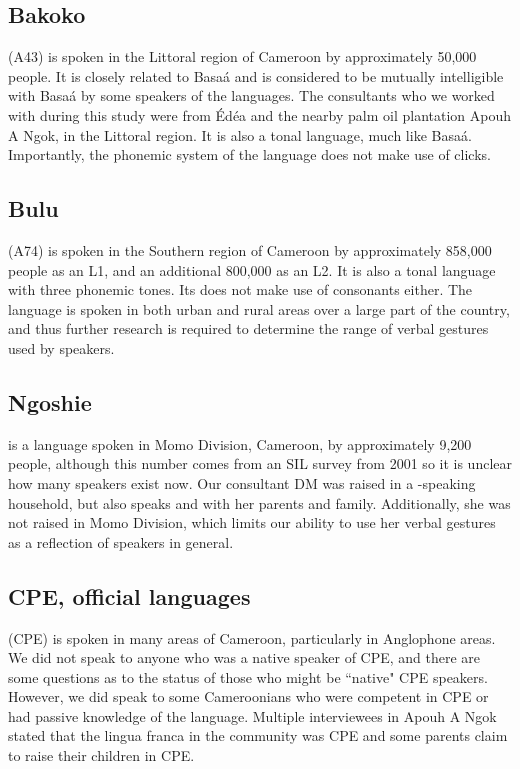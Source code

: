 \documentclass[output=paper,newtxmath,modfonts,nonflat,hidelinks]{langsci/langscibook}
\begin{document}
\subsection{Bakoko}

 (A43) is spoken in the Littoral region of Cameroon by approximately 50,000 people. It is closely related to Basa\'a and is considered to be mutually intelligible with Basa\'a by some speakers of the languages. The  consultants who we worked with during this study were from \'Ed\'ea and the nearby palm oil plantation Apouh A Ngok, in the Littoral region. It is also a tonal language, much like Basa\'a. Importantly, the phonemic system of the language does not make use of clicks. 

\subsection{Bulu}

 (A74) is spoken in the Southern region of Cameroon by approximately 858,000 people as an L1, and an additional 800,000 as an L2. It is also a tonal language with three phonemic tones. Its  does not make use of  consonants either. The language is spoken in both urban and rural areas over a large part of the country, and thus further research is required to determine the range of verbal gestures used by  speakers. 

\subsection{Ngoshie}
 is a   language spoken in Momo Division, Cameroon, by approximately 9,200 people, although this number comes from an SIL survey from 2001 \citep{lewisetal2016} so it is unclear how many speakers exist now. Our consultant DM was raised in a -speaking household, but also speaks  and  with her parents and family. Additionally, she was not raised in Momo Division, which limits our ability to use her verbal gestures as a reflection of  speakers in general. %

\subsection{CPE, official languages}

 (CPE) is spoken in many areas of Cameroon, particularly in Anglophone areas. We did not speak to anyone who was a native speaker of CPE, and there are some questions as to the status of those who might be ``native" CPE speakers. However, we did speak to some Cameroonians who were competent in CPE or had passive knowledge of the language. Multiple interviewees in Apouh A Ngok stated that the lingua franca in the community was CPE and some parents claim to raise their children in CPE. 
\end{document}
